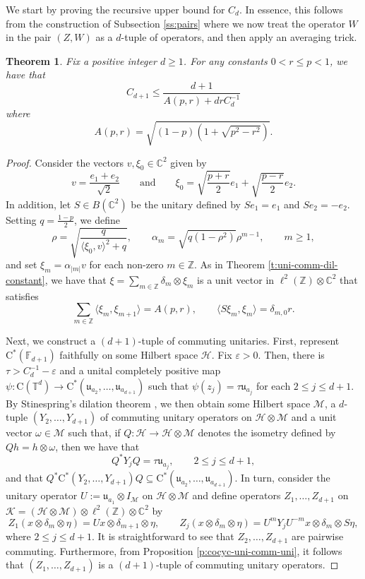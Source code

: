 \documentclass[10pt]{amsart}
\newcommand{\bC}{{\mathbb{C}}}
\newcommand{\bF}{{\mathbb{F}}}
\newcommand{\bT}{{\mathbb{T}}}
\newcommand{\bZ}{{\mathbb{Z}}}
\renewcommand{\H}{{\mathcal{H}}}
\newcommand{\K}{{\mathcal{K}}}
\newcommand{\M}{{\mathcal{M}}}
\newcommand{\rC}{\mathrm{C}}
\newtheorem{theorem}{Theorem}[section]
\begin{document}
We start by proving the recursive upper bound for $C_d$. In essence, this follows from the construction of Subsection \ref{ss:pairs} where we now treat the operator $W$ in the pair $(Z,W)$ as a $d$-tuple of operators, and then apply an averaging trick.

\begin{theorem}\label{t:recursive-bound}
    Fix a positive integer $d\geq 1$. For any constants $0 < r \leq p < 1$, we have that
    \[
        C_{d+1}\leq \frac{d+1}{A(p,r) + drC_d^{-1}}
    \]
    where
    \[
        A(p,r) = \sqrt{(1-p)\left( 1+\sqrt{p^2-r^2}\right)}.
    \]
\end{theorem}

\begin{proof}
    Consider the vectors $v,\xi_0\in\bC^2$ given by
    \[
        v = \frac{e_1+e_2}{\sqrt{2}} \qquad \text{and} \qquad \xi_0 = \sqrt{\frac{p+r}{2}} e_1 + \sqrt{\frac{p-r}{2}}e_2.
    \]
    In addition, let $S\in B(\bC^2)$ be the unitary defined by $Se_1 = e_1$ and $Se_2 = -e_2$. Setting $q = \frac{1-p}{2}$, we define
    \[
        \rho = \sqrt{\frac{q}{\langle\xi_0, v\rangle^2+q}}, \qquad \alpha_m = \sqrt{q(1-\rho^2)}\rho^{m-1}, \qquad m\geq 1,
    \]
    and set $\xi_m = \alpha_{|m|}v$ for each non-zero $m\in\bZ$. As in Theorem \ref{t:uni-comm-dil-constant}, we have that $\xi = \sum_{m\in\bZ}\delta_m\otimes\xi_m$ is a unit vector in $\ell^2(\bZ)\otimes\bC^2$ that satisfies
    \[
        \sum_{m\in\bZ}\langle\xi_m, \xi_{m+1}\rangle = A(p,r), \qquad \langle S\xi_m, \xi_m\rangle = \delta_{m,0}r.
    \]

    Next, we construct a $(d+1)$-tuple of commuting unitaries. First, represent $\rC^*(\bF_{d+1})$ faithfully on some Hilbert space $\H$. Fix $\varepsilon>0$. Then, there is $\tau>C_d^{-1}-\varepsilon$ and a unital completely positive map $\psi:\rC(\bT^d)\rightarrow\rC^*(\mathfrak{u}_{a_2}, \ldots, \mathfrak{u}_{a_{d+1}})$ such that $\psi(z_j) = \tau\mathfrak{u}_{a_j}$ for each $2\leq j\leq d+1$. By Stinespring's dilation theorem \cite{stinespring1955positive}, we then obtain some Hilbert space $\M$, a $d$-tuple $(Y_2,\ldots, Y_{d+1})$ of commuting unitary operators on $\H\otimes\M$ and a unit vector $\omega\in\M$ such that, if $Q:\H\rightarrow\H\otimes\M$ denotes the isometry defined by $Q h = h\otimes \omega$, then we have that
    \[
        Q^* Y_j Q = \tau\mathfrak{u}_{a_j}, \qquad 2\leq j\leq d+1,
    \]
    and that $Q^*\rC^*(Y_2, \ldots, Y_{d+1})Q \subseteq \rC^*(\mathfrak{u}_{a_2},\ldots, \mathfrak{u}_{a_{d+1}})$. In turn, consider the unitary operator $U := \mathfrak{u}_{a_1}\otimes I_\M$ on $\H\otimes\M$ and define operators $Z_1,\ldots, Z_{d+1}$ on $\K = (\H\otimes\M)\otimes\ell^2(\bZ)\otimes\bC^2$ by
    \[
        Z_1(x\otimes\delta_m \otimes\eta) = Ux\otimes \delta_{m+1}\otimes\eta, \qquad Z_j(x\otimes \delta_m\otimes\eta) = U^mY_jU^{-m}x\otimes \delta_m \otimes S\eta,
    \]
    where $2\leq j\leq d+1$. It is straightforward to see that $Z_2,\ldots, Z_{d+1}$ are pairwise commuting. Furthermore, from Proposition \ref{p:cocyc-uni-comm-uni}, it follows that $(Z_1, \ldots, Z_{d+1})$ is a $(d+1)$-tuple of commuting unitary operators.


\end{proof}
\end{document}
